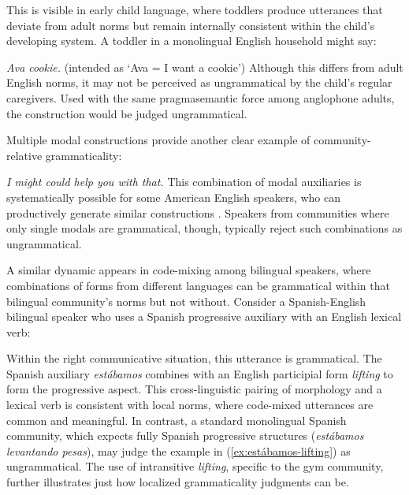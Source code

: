 \documentclass[12pt,letterpaper]{article}
\begin{document}
This is visible in early child language, where toddlers produce utterances that deviate from adult norms but remain internally consistent within the child's developing system. A toddler in a monolingual English household might say:

\ea
\textit{Ava cookie.} (intended as `Ava = I want a cookie')
\z
Although this differs from adult English norms, it may not be perceived as ungrammatical by the child's regular caregivers. Used with the same pragmasemantic force among anglophone adults, the construction would be judged ungrammatical.

Multiple modal constructions provide another clear example of community-relative grammaticality:

\ea
\textit{I might could help you with that.}
\z
This combination of modal auxiliaries is systematically possible for some American English speakers, who can productively generate similar constructions \autocite{morin2024semantics}. Speakers from communities where only single modals are grammatical, though, typically reject such combinations as ungrammatical.

A similar dynamic appears in code-mixing among bilingual speakers, where combinations of forms from different languages can be grammatical within that bilingual community's norms but not without. Consider a Spanish-English bilingual speaker who uses a Spanish progressive auxiliary with an English lexical verb:

 \label{ex:estábamos-lifting}
\z
Within the right communicative situation, this utterance is grammatical. The Spanish auxiliary \textit{estábamos} combines with an English participial form \textit{lifting} to form the progressive aspect. This cross-linguistic pairing of morphology and a lexical verb is consistent with local norms, where code-mixed utterances are common and meaningful. In contrast, a standard monolingual Spanish community, which expects fully Spanish progressive structures (\textit{estábamos levantando pesas}), may judge the example in (\ref{ex:estábamos-lifting}) as ungrammatical. The use of intransitive \textit{lifting}, specific to the gym community, further illustrates just how localized grammaticality judgments can be.
\end{document}
